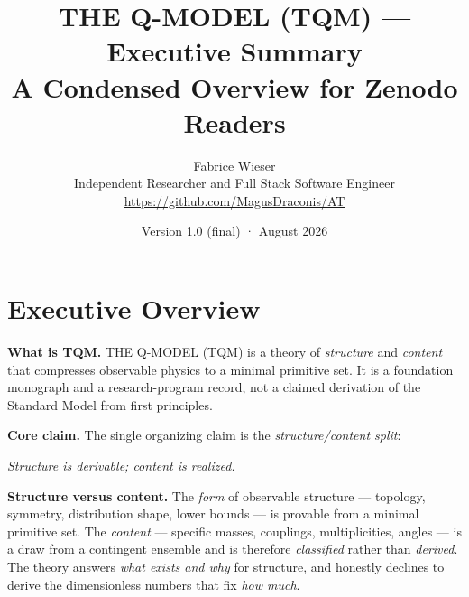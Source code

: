 \documentclass[10pt,a4paper]{article}
\title{\bfseries THE Q-MODEL (TQM) — Executive Summary\\[2mm]
\large A Condensed Overview for Zenodo Readers}
\author{Fabrice Wieser\\[1mm]
\small Independent Researcher and Full Stack Software Engineer\\[0.5mm]
\small \url{https://github.com/MagusDraconis/AT}}
\date{Version 1.0 (final) \quad·\quad 15 August 2026}
\begin{document}
\maketitle

\begin{center}
\end{center}

\vspace{2mm}

\section{Executive Overview}

\textbf{What is TQM.} THE Q-MODEL (TQM) is a theory of \emph{structure} and \emph{content}
that compresses observable physics to a minimal primitive set. It is a foundation
monograph and a research-program record, not a claimed derivation of the Standard Model
from first principles.

\textbf{Core claim.} The single organizing claim is the \emph{structure/content split}:

\begin{center}
\emph{Structure is derivable; content is realized.}
\end{center}

\textbf{Structure versus content.} The \emph{form} of observable structure --- topology,
symmetry, distribution shape, lower bounds --- is provable from a minimal primitive set.
The \emph{content} --- specific masses, couplings, multiplicities, angles --- is a draw
from a contingent ensemble and is therefore \emph{classified} rather than \emph{derived}.
The theory answers \emph{what exists and why} for structure, and honestly declines to
derive the dimensionless numbers that fix \emph{how much}.
\end{document}
